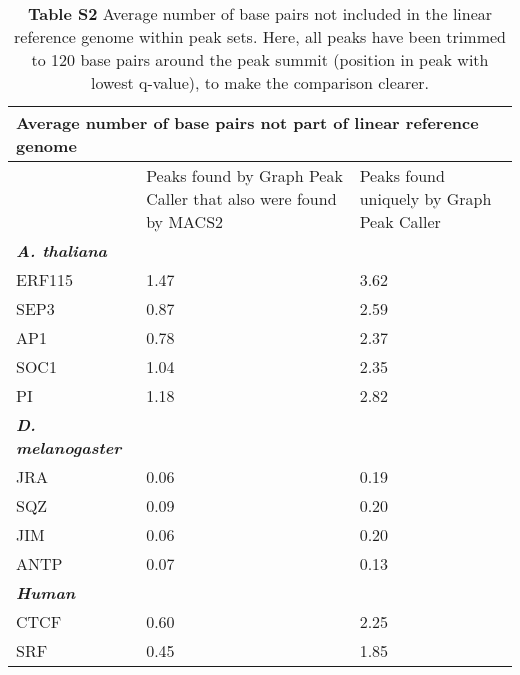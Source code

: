 \documentclass[a4paper,8pt]{article}
\title{}
\author{}
\begin{document}
\begin{table}[!ht]
\begin{adjustwidth}{-1.25in}{0in} %
\centering
\caption*{\textbf{Table S2} Average number of base pairs not included in the linear reference genome within peak sets.
  Here, all peaks have been trimmed to 120 base pairs around the peak summit (position in peak with lowest q-value), to make the comparison clearer.}
\label{tableS2}
\begin{tabularx}{1.6\textwidth}{b|X|X}
  \multicolumn{3}{l}{\textbf{Average number of base pairs not part of linear reference genome}} \\ \hline
\toprule
   & Peaks found by Graph Peak Caller that also were found by MACS2 & Peaks found uniquely by Graph Peak Caller\\
  \emph{\textbf{A. thaliana}} & & \\ \hline
  ERF115 & 1.47 & 3.62 \\
  SEP3 & 0.87 & 2.59 \\
  AP1 & 0.78 & 2.37 \\
  SOC1 & 1.04 & 2.35 \\
  PI & 1.18 & 2.82 \\ \hline
  
  \emph{\textbf{D. melanogaster}} & & \\ \hline
  JRA & 0.06 & 0.19 \\
  SQZ & 0.09 & 0.20 \\
  JIM & 0.06 & 0.20\\
  ANTP & 0.07 & 0.13 \\
  
  \emph{\textbf{Human}} & & \\ \hline
  CTCF & 0.60 & 2.25 \\
  SRF & 0.45 & 1.85 \\
  
  
  
\bottomrule
\end{tabularx}
\end{adjustwidth}
\end{table}
\end{document}
